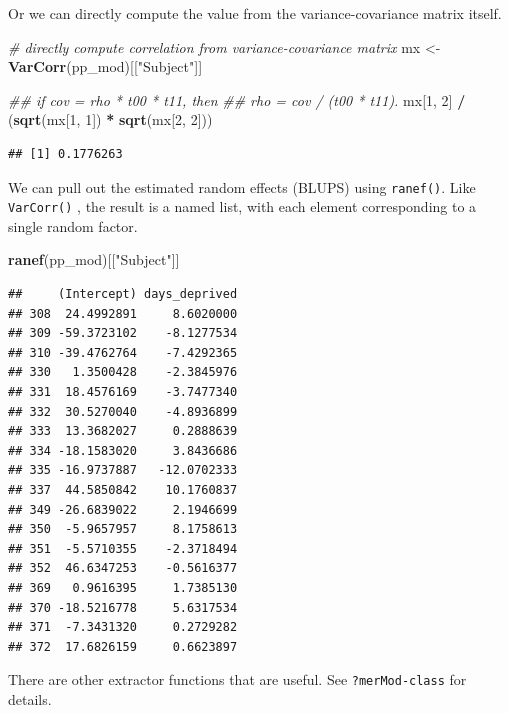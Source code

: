 \documentclass[]{book}
\newenvironment{Shaded}{\begin{snugshade}}{\end{snugshade}}
\newcommand{\CommentTok}[1]{\textcolor[rgb]{0.56,0.35,0.01}{\textit{#1}}}
\newcommand{\DecValTok}[1]{\textcolor[rgb]{0.00,0.00,0.81}{#1}}
\newcommand{\KeywordTok}[1]{\textcolor[rgb]{0.13,0.29,0.53}{\textbf{#1}}}
\newcommand{\NormalTok}[1]{#1}
\newcommand{\OperatorTok}[1]{\textcolor[rgb]{0.81,0.36,0.00}{\textbf{#1}}}
\newcommand{\StringTok}[1]{\textcolor[rgb]{0.31,0.60,0.02}{#1}}
\begin{document}
Or we can directly compute the value from the variance-covariance matrix itself.

\begin{Shaded}
\begin{Highlighting}[]
\CommentTok{# directly compute correlation from variance-covariance matrix}
\NormalTok{mx <-}\StringTok{ }\KeywordTok{VarCorr}\NormalTok{(pp_mod)[[}\StringTok{"Subject"}\NormalTok{]]}

\CommentTok{## if cov = rho * t00 * t11, then}
\CommentTok{## rho = cov / (t00 * t11).}
\NormalTok{mx[}\DecValTok{1}\NormalTok{, }\DecValTok{2}\NormalTok{] }\OperatorTok{/}\StringTok{ }\NormalTok{(}\KeywordTok{sqrt}\NormalTok{(mx[}\DecValTok{1}\NormalTok{, }\DecValTok{1}\NormalTok{]) }\OperatorTok{*}\StringTok{ }\KeywordTok{sqrt}\NormalTok{(mx[}\DecValTok{2}\NormalTok{, }\DecValTok{2}\NormalTok{]))}
\end{Highlighting}
\end{Shaded}

\begin{verbatim}
## [1] 0.1776263
\end{verbatim}

We can pull out the estimated random effects (BLUPS) using \texttt{ranef()}. Like \texttt{VarCorr()} , the result is a named list, with each element corresponding to a single random factor.

\begin{Shaded}
\begin{Highlighting}[]
\KeywordTok{ranef}\NormalTok{(pp_mod)[[}\StringTok{"Subject"}\NormalTok{]]}
\end{Highlighting}
\end{Shaded}

\begin{verbatim}
##     (Intercept) days_deprived
## 308  24.4992891     8.6020000
## 309 -59.3723102    -8.1277534
## 310 -39.4762764    -7.4292365
## 330   1.3500428    -2.3845976
## 331  18.4576169    -3.7477340
## 332  30.5270040    -4.8936899
## 333  13.3682027     0.2888639
## 334 -18.1583020     3.8436686
## 335 -16.9737887   -12.0702333
## 337  44.5850842    10.1760837
## 349 -26.6839022     2.1946699
## 350  -5.9657957     8.1758613
## 351  -5.5710355    -2.3718494
## 352  46.6347253    -0.5616377
## 369   0.9616395     1.7385130
## 370 -18.5216778     5.6317534
## 371  -7.3431320     0.2729282
## 372  17.6826159     0.6623897
\end{verbatim}

There are other extractor functions that are useful. See \texttt{?merMod-class} for details.
\end{document}
